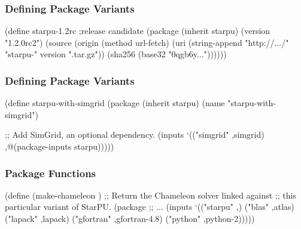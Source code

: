 \documentclass{beamer}
\begin{document}
\begin{frame}[fragile]
  \frametitle{Defining Package Variants}

  \begin{semiverbatim}
\small{
(define starpu-1.2rc              ;release candidate
  (package (\alert{inherit} starpu)
    (version "1.2.0rc2")
    (source (origin
             (method url-fetch)
             (uri (string-append "http://\textrm{...}/"
                                 "starpu-" version ".tar.gz"))
             (sha256 (base32 "0qgb6y\textrm{...}"))))))
}
  \end{semiverbatim}
\end{frame}

\begin{frame}[fragile]
  \frametitle{Defining Package Variants}
  
  \begin{semiverbatim}
\small{
(define starpu-with-simgrid
  (package (\alert{inherit} starpu)
    (name "starpu-with-simgrid")

    ;; Add SimGrid, an optional dependency.
    (inputs `(("simgrid" ,simgrid)
              ,@(package-inputs starpu)))))
}
  \end{semiverbatim}
\end{frame}

\begin{frame}[fragile]
  \frametitle{Package Functions}

  \begin{semiverbatim}
\small{
  (define (\alert{make-chameleon} )
     ;; Return the Chameleon solver linked against
     ;; this particular variant of StarPU.
     (\alert{package}
       ;; \textrm{...}
       (inputs `(("starpu" ,)
                 ("blas" ,atlas)
                 ("lapack" ,lapack)
                 ("gfortran" ,gfortran-4.8)
                 ("python" ,python-2)))))
}
  \end{semiverbatim}

\end{frame}

\begin{frame}[plain]
\end{frame}
\end{document}

